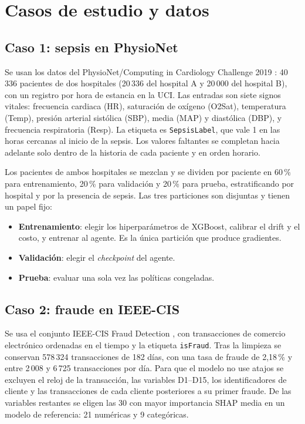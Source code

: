 \section{Casos de estudio y datos}
\label{sec:met_datos}

\subsection{Caso 1: sepsis en PhysioNet}

Se usan los datos del PhysioNet/Computing in Cardiology Challenge 2019
\cite{reyna2020sepsis}: 40\,336 pacientes de dos hospitales (20\,336 del hospital A y 20\,000
del hospital B), con un registro por hora de estancia en la UCI. Las entradas son siete signos
vitales: frecuencia cardiaca (HR), saturación de oxígeno (O2Sat), temperatura (Temp), presión
arterial sistólica (SBP), media (MAP) y diastólica (DBP), y frecuencia respiratoria (Resp). La
etiqueta es \texttt{SepsisLabel}, que vale 1 en las horas cercanas al inicio de la sepsis. Los
valores faltantes se completan hacia adelante solo dentro de la historia de cada paciente y en
orden horario.

Los pacientes de ambos hospitales se mezclan y se dividen por paciente en 60\,\% para
entrenamiento, 20\,\% para validación y 20\,\% para prueba, estratificando por hospital y por la
presencia de sepsis. Las tres particiones son disjuntas y tienen un papel fijo:

\begin{itemize}
    \item \textbf{Entrenamiento}: elegir los hiperparámetros de XGBoost, calibrar el drift y el
    costo, y entrenar al agente. Es la única partición que produce gradientes.
    \item \textbf{Validación}: elegir el \textit{checkpoint} del agente.
    \item \textbf{Prueba}: evaluar una sola vez las políticas congeladas.
\end{itemize}

\subsection{Caso 2: fraude en IEEE-CIS}

Se usa el conjunto IEEE-CIS Fraud Detection \cite{ieeecis2019fraud}, con transacciones de comercio electrónico
ordenadas en el tiempo y la etiqueta \texttt{isFraud}. Tras la limpieza se conservan 578\,324
transacciones de 182 días, con una tasa de fraude de 2,18\,\% y entre 2\,008 y 6\,725
transacciones por día. Para que el modelo no use atajos se excluyen el reloj de la transacción,
las variables D1--D15, los identificadores de cliente y las transacciones de cada cliente
posteriores a su primer fraude. De las variables restantes se eligen las 30 con mayor
importancia SHAP \cite{lundberg2017shap} media en un modelo de referencia: 21 numéricas y 9 categóricas.

